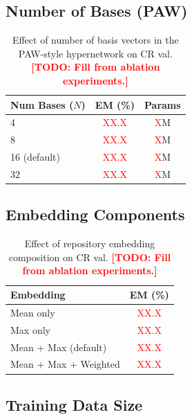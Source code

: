 \documentclass[11pt]{article}
\newcommand{\todo}[1]{\textcolor{red}{\textbf{[TODO: #1]}}}
\newcommand{\todoinline}[1]{\textcolor{red}{#1}}
\begin{document}
\subsection{Number of Bases (PAW)}

\begin{table}[t]
\centering
\small
\begin{tabular}{lcc}
\toprule
Num Bases ($N$) & EM (\%) & Params \\
\midrule
4 & \todoinline{XX.X} & \todoinline{X}M \\
8 & \todoinline{XX.X} & \todoinline{X}M \\
16 (default) & \todoinline{XX.X} & \todoinline{X}M \\
32 & \todoinline{XX.X} & \todoinline{X}M \\
\bottomrule
\end{tabular}
\caption{Effect of number of basis vectors in the PAW-style hypernetwork on CR val. \todo{Fill from ablation experiments.}}
\label{tab:ablation_bases}
\end{table}

\subsection{Embedding Components}

\begin{table}[t]
\centering
\small
\begin{tabular}{lc}
\toprule
Embedding & EM (\%) \\
\midrule
Mean only & \todoinline{XX.X} \\
Max only & \todoinline{XX.X} \\
Mean + Max (default) & \todoinline{XX.X} \\
Mean + Max + Weighted & \todoinline{XX.X} \\
\bottomrule
\end{tabular}
\caption{Effect of repository embedding composition on CR val. \todo{Fill from ablation experiments.}}
\label{tab:ablation_embedding}
\end{table}

\subsection{Training Data Size}
\end{document}
